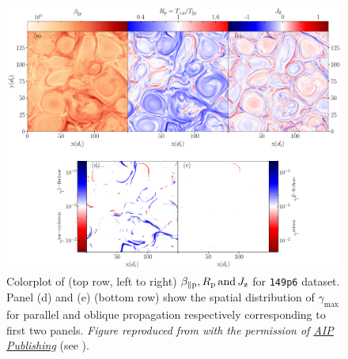             \begin{figure}
                \begin{center}
                    \includegraphics[width=1\textwidth]{figures/chap5/data_Rp_betap_jz_b_149p6_hb_gamma_k_149p6_hb.pdf}
                    \caption[Plot of $\beta_{\parallel \rm p}, R_{\rm p}, J_{\rm z} \mathrm{\,and\,}
                    \gamma$ for \texttt{149p6} dataset]{Colorplot of (top row, left to right)
                    $\beta_{\parallel \rm p}, R_{\rm p} \mathrm{\,and\,} J_{\rm z}$ for
                    \texttt{149p6} dataset. Panel (d) and (e) (bottom row) show the spatial
                    distribution of $\gamma_{\max}$ for parallel and oblique propagation
                    respectively corresponding to first two panels. \textit{Figure reproduced from
                    \citet{Qudsi2020a} with the permission of
                    \href{https://publishing.aip.org/}{AIP Publishing}} (see
                    ).}
                    \label{fig:brjhb}
                \end{center}
            \end{figure}

